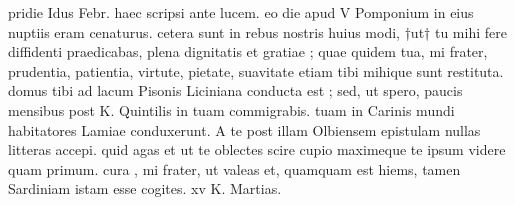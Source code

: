  pridie Idus Febr. haec scripsi ante lucem. eo die apud V Pomponium in eius nuptiis eram cenaturus. cetera sunt in rebus nostris huius modi, †ut† tu mihi fere diffidenti praedicabas, plena dignitatis et gratiae ; quae quidem tua, mi frater, prudentia, patientia, virtute, pietate, suavitate etiam tibi mihique sunt restituta. domus tibi ad lacum Pisonis Liciniana conducta est ; sed, ut spero, paucis mensibus post K. Quintilis in tuam commigrabis. tuam in Carinis mundi habitatores Lamiae conduxerunt. A te post illam Olbiensem epistulam nullas litteras accepi. quid agas et ut te oblectes scire cupio maximeque te ipsum videre quam primum. cura , mi frater, ut valeas et, quamquam est hiems, tamen Sardiniam istam esse cogites. xv K. Martias.
